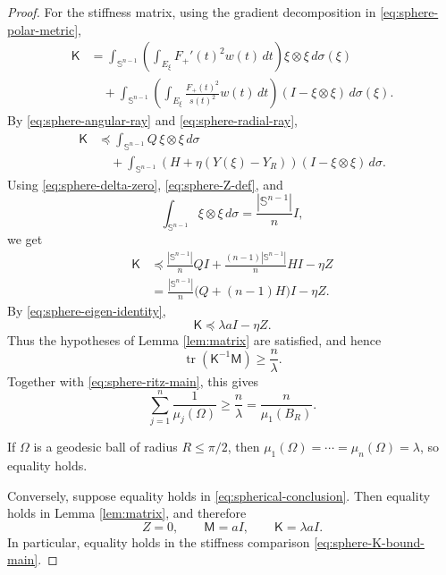 \documentclass[11pt]{amsart}
\theoremstyle{remark}
\DeclareMathOperator{\tr}{tr}
\newcommand{\Sn}{\mathbb S}
\newcommand{\Id}{I}
\newcommand{\mcM}{\mathsf M}
\newcommand{\mcK}{\mathsf K}
\begin{document}
\begin{proof}
For the stiffness matrix, using the gradient decomposition in \eqref{eq:sphere-polar-metric},
\begin{align*}
        \mcK
        &=\int_{\Sn^{n-1}}
        \left(\int_{E_\xi}F_+'(t)^2w(t)\,dt\right)
        \xi\otimes\xi\,d\sigma(\xi)\\
        &\quad+
        \int_{\Sn^{n-1}}
        \left(\int_{E_\xi}\frac{F_+(t)^2}{s(t)^2}w(t)\,dt\right)
        (\Id-\xi\otimes\xi)\,d\sigma(\xi).
\end{align*}
By \eqref{eq:sphere-angular-ray} and \eqref{eq:sphere-radial-ray},
\begin{align*}
        \mcK
        &\preceq
        \int_{\Sn^{n-1}}Q\,\xi\otimes\xi\,d\sigma\\
        &\quad+
        \int_{\Sn^{n-1}}
        \left(H+\eta(Y(\xi)-Y_R)\right)
        (\Id-\xi\otimes\xi)\,d\sigma.
\end{align*}
Using \eqref{eq:sphere-delta-zero}, \eqref{eq:sphere-Z-def}, and
$$
        \int_{\Sn^{n-1}}\xi\otimes\xi\,d\sigma=\frac{|\Sn^{n-1}|}{n}\Id,
$$
we get
\begin{align*}
        \mcK
        &\preceq
        \frac{|\Sn^{n-1}|}{n}Q\Id
        +\frac{(n-1)|\Sn^{n-1}|}{n}H\Id
        -\eta Z\\
        &=\frac{|\Sn^{n-1}|}{n}\bigl(Q+(n-1)H\bigr)\Id-\eta Z.
\end{align*}
By \eqref{eq:sphere-eigen-identity},
\begin{equation}\label{eq:sphere-K-bound-main}
        \mcK\preceq \lambda a\Id-\eta Z.
\end{equation}
Thus the hypotheses of Lemma \ref{lem:matrix} are satisfied, and hence
\begin{equation}\label{eq:sphere-trace-lower}
        \tr(\mcK^{-1}\mcM)\ge \frac{n}{\lambda}.
\end{equation}
Together with \eqref{eq:sphere-ritz-main}, this gives
$$
        \sum_{j=1}^n\frac1{\mu_j(\Omega)}
        \ge \frac{n}{\lambda}
        =\frac{n}{\mu_1(B_R)}.
$$

If $\Omega$ is a geodesic ball of radius $R\le\pi/2$, then $\mu_1(\Omega)=\cdots=\mu_n(\Omega)=\lambda$, so equality holds.

Conversely, suppose equality holds in \eqref{eq:spherical-conclusion}.  Then equality holds in Lemma \ref{lem:matrix}, and therefore
\begin{equation}\label{eq:sphere-equality-MKZ}
        Z=0,
        \qquad
        \mcM=a\Id,
        \qquad
        \mcK=\lambda a\Id.
\end{equation}
In particular, equality holds in the stiffness comparison \eqref{eq:sphere-K-bound-main}.


\end{proof}
\end{document}
